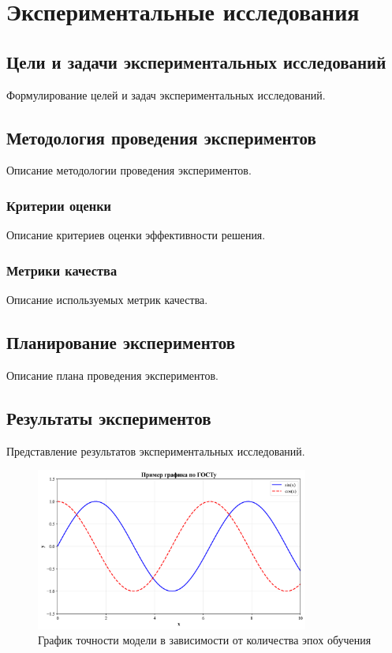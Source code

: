 \chapter{Экспериментальные исследования}

\section{Цели и задачи экспериментальных исследований}

Формулирование целей и задач экспериментальных исследований.

\section{Методология проведения экспериментов}

Описание методологии проведения экспериментов.

\subsection{Критерии оценки}

Описание критериев оценки эффективности решения.

\subsection{Метрики качества}

Описание используемых метрик качества.

\section{Планирование экспериментов}

Описание плана проведения экспериментов.

\section{Результаты экспериментов}

Представление результатов экспериментальных исследований.

\begin{figure}[H]
\centering
\includegraphics[width=0.8\textwidth]{images/example_plot.png}
\caption{График точности модели в зависимости от количества эпох обучения}
\label{fig:accuracy_plot}
\end{figure}

